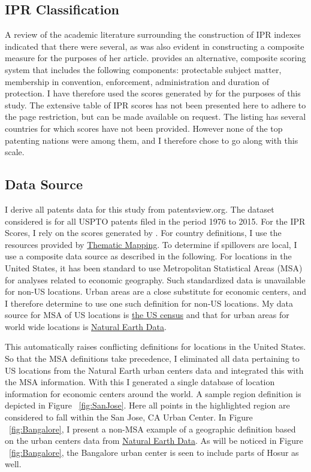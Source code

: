 \documentclass[12pt]{article}
\begin{document}
\subsection{IPR Classification}
A review of the academic literature surrounding the construction of IPR indexes indicated that there were several, as was also evident in \cite{Zhao2006} constructing a composite measure for the purposes of her article. \cite{Lesser2010} provides an alternative, composite scoring system that includes the following components: protectable subject matter, membership in convention, enforcement, administration and duration of protection. I have therefore used the scores generated by \cite{Lesser2010} for the purposes of this study. The extensive table of IPR scores has not been presented here to adhere to the page restriction, but can be made available on request. The listing has several countries for which scores have not been provided. However none of the top patenting nations were among them, and I therefore chose to go along with this scale.%

\subsection{Data Source}
I derive all patents data for this study from patentsview.org. The dataset considered is for all USPTO patents filed in the period 1976 to 2015. For the IPR Scores, I rely on the scores generated by \cite{Lesser2010}. For country definitions, I use the resources provided by \href{http://thematicmapping.org/downloads/world_borders.php}{Thematic Mapping}. To determine if spillovers are local, I use a composite data source as described in the following. For locations in the United States, it has been standard to use Metropolitan Statistical Areas (MSA) for analyses related to economic geography. Such standardized data is unavailable for non-US locations. Urban areas are a close substitute for  economic centers, and I therefore determine to use one such definition for non-US locations. My data source for MSA of US locations is \href{http://www.census.gov/geo/maps-data/data/cbf/cbf_msa.html}{the US census} and that for urban areas for world wide locations is \href{http://www.naturalearthdata.com/downloads/10m-cultural-vectors/}{Natural Earth Data}.
 
This automatically raises conflicting definitions for locations in the United States. So that the MSA definitions take precedence, I eliminated all data pertaining to US locations from the Natural Earth urban centers data and integrated this with the MSA information. With this I  generated a single database of location information for economic centers around the world. A sample region definition is depicted in Figure ~\ref{fig:SanJose}. Here all points in the highlighted region are considered to fall within the San Jose, CA Urban Center. In Figure ~\ref{fig:Bangalore}, I present a non-MSA example of a geographic definition based on the urban centers data from \href{http://www.naturalearthdata.com/downloads/10m-cultural-vectors/}{Natural Earth Data}. As will be noticed in Figure ~\ref{fig:Bangalore}, the Bangalore urban center is seen to include parts of Hosur as well.
\end{document}
